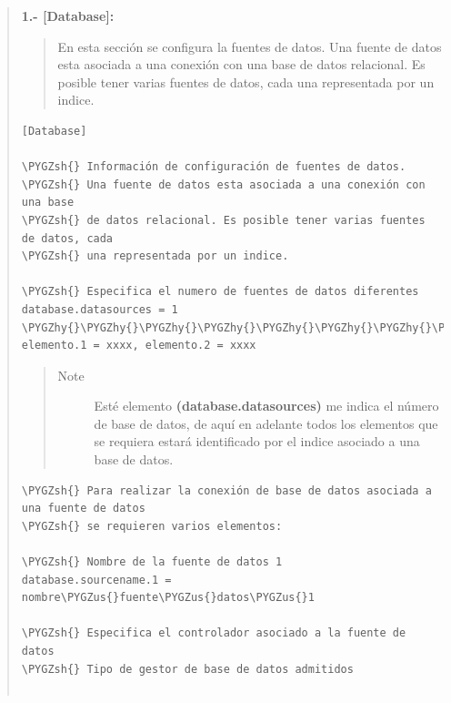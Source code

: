 \documentclass[letterpaper,11pt,spanish]{sphinxmanual}
\def\PYGZus{\char`\_}
\def\PYGZgt{\char`\>}
\def\PYGZsh{\char`\#}
\def\PYGZhy{\char`\-}
\begin{document}
\begin{quote}

\textbf{1.- {[}Database{]}:}
\begin{quote}

En esta sección se configura la fuentes de datos. Una fuente de datos esta asociada a una conexión con una base de datos relacional. Es posible tener varias fuentes de datos, cada una representada por un indice.
\end{quote}

\begin{Verbatim}[commandchars=\\\{\}]
[Database]

\PYGZsh{} Información de configuración de fuentes de datos.
\PYGZsh{} Una fuente de datos esta asociada a una conexión con una base
\PYGZsh{} de datos relacional. Es posible tener varias fuentes de datos, cada
\PYGZsh{} una representada por un indice.

\PYGZsh{} Especifica el numero de fuentes de datos diferentes
database.datasources = 1                                \PYGZhy{}\PYGZhy{}\PYGZhy{}\PYGZhy{}\PYGZhy{}\PYGZhy{}\PYGZhy{}\PYGZhy{}\PYGZhy{}\PYGZhy{}\PYGZhy{}\PYGZhy{}\PYGZhy{}\PYGZhy{}\PYGZhy{}\PYGZhy{}\PYGZhy{}\PYGZhy{}\PYGZhy{}\PYGZhy{}\PYGZhy{}\PYGZhy{}\PYGZhy{}\PYGZhy{}\PYGZhy{}\PYGZgt{}Ejemplo: elemento.1 = xxxx, elemento.2 = xxxx
\end{Verbatim}
\begin{quote}\begin{description}
\item[{Note}] \leavevmode
Esté elemento \textbf{(database.datasources)} me indica el número de base de datos, de aquí en adelante todos los elementos que se  requiera estará identificado por el indice asociado a una base de datos.

\end{description}\end{quote}

\begin{Verbatim}[commandchars=\\\{\}]
\PYGZsh{} Para realizar la conexión de base de datos asociada a una fuente de datos
\PYGZsh{} se requieren varios elementos:

\PYGZsh{} Nombre de la fuente de datos 1
database.sourcename.1 = nombre\PYGZus{}fuente\PYGZus{}datos\PYGZus{}1

\PYGZsh{} Especifica el controlador asociado a la fuente de datos
\PYGZsh{} Tipo de gestor de base de datos admitidos


\end{Verbatim}
\end{quote}
\end{document}
